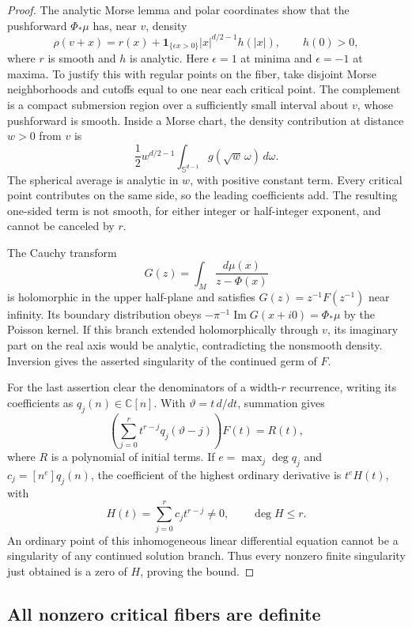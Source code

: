 \documentclass[11pt,a4paper]{article}
\theoremstyle{definition}
\theoremstyle{remark}
\numberwithin{equation}{section}
\begin{document}
\begin{proof}
The analytic Morse lemma and polar coordinates show that the pushforward
$\Phi_*\mu$ has, near $v$, density
\[
 \rho(v+x)=r(x)+\boldsymbol1_{\{\epsilon x>0\}}
 |x|^{d/2-1}h(|x|),\qquad h(0)>0,
\]
where $r$ is smooth and $h$ is analytic.  Here $\epsilon=1$ at minima and
$\epsilon=-1$ at maxima.  To justify this with regular points on the fiber,
take disjoint Morse neighborhoods and cutoffs equal to one near each critical
point.  The complement is a compact submersion region over a sufficiently
small interval about $v$, whose pushforward is smooth.  Inside a Morse chart,
the density contribution at distance $w>0$ from $v$ is
\[
 \frac12w^{d/2-1}\int_{\mathbb S^{d-1}}g(\sqrt w\,\omega)\,d\omega.
\]
The spherical average is analytic in $w$, with positive constant term.
Every critical point contributes on the same side, so the leading
coefficients add.  The resulting one-sided term is not smooth, for either
integer or half-integer exponent, and cannot be canceled by $r$.

The Cauchy transform
\[
 G(z)=\int_M\frac{d\mu(x)}{z-\Phi(x)}
\]
is holomorphic in the upper half-plane and satisfies
$G(z)=z^{-1}F(z^{-1})$ near infinity.  Its boundary distribution obeys
$-\pi^{-1}\operatorname{Im}G(x+i0)=\Phi_*\mu$ by the Poisson kernel.
If this branch extended holomorphically through $v$, its imaginary part on
the real axis would be analytic, contradicting the nonsmooth density.
Inversion gives the asserted singularity of the continued germ of $F$.

For the last assertion clear the denominators of a width-$r$ recurrence,
writing its coefficients as $q_j(n)\in\mathbb C[n]$.  With
$\vartheta=t\,d/dt$, summation gives
\[
 \left(\sum_{j=0}^r t^{r-j}q_j(\vartheta-j)\right)F(t)=R(t),
\]
where $R$ is a polynomial of initial terms.  If
$e=\max_j\deg q_j$ and $c_j=[n^e]q_j(n)$, the coefficient of the
highest ordinary derivative is $t^eH(t)$, with
\[
 H(t)=\sum_{j=0}^r c_jt^{r-j}\ne0,\qquad \deg H\leq r.
\]
An ordinary point of this inhomogeneous linear differential equation cannot
be a singularity of any continued solution branch.  Thus every nonzero
finite singularity just obtained is a zero of $H$, proving the bound.
\end{proof}

\subsection{All nonzero critical fibers are definite}
\end{document}
